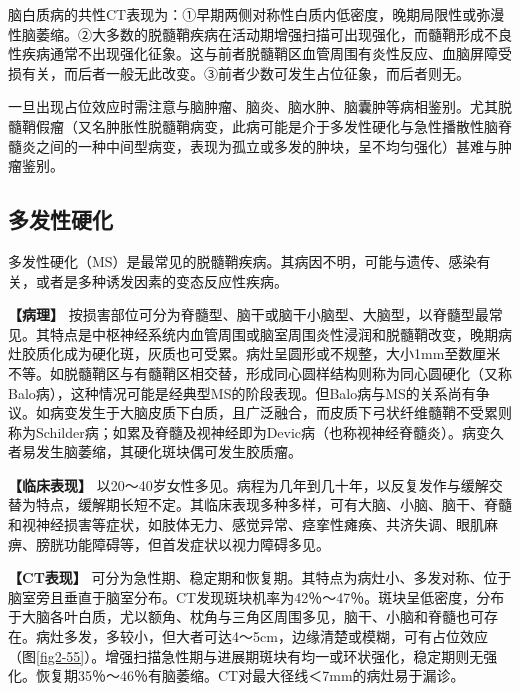 脑白质病的共性CT表现为：①早期两侧对称性白质内低密度，晚期局限性或弥漫性脑萎缩。②大多数的脱髓鞘疾病在活动期增强扫描可出现强化，而髓鞘形成不良性疾病通常不出现强化征象。这与前者脱髓鞘区血管周围有炎性反应、血脑屏障受损有关，而后者一般无此改变。③前者少数可发生占位征象，而后者则无。

一旦出现占位效应时需注意与脑肿瘤、脑炎、脑水肿、脑囊肿等病相鉴别。尤其脱髓鞘假瘤（又名肿胀性脱髓鞘病变，此病可能是介于多发性硬化与急性播散性脑脊髓炎之间的一种中间型病变，表现为孤立或多发的肿块，呈不均匀强化）甚难与肿瘤鉴别。

\subsection{多发性硬化}

多发性硬化（MS）是最常见的脱髓鞘疾病。其病因不明，可能与遗传、感染有关，或者是多种诱发因素的变态反应性疾病。

\textbf{【病理】}
按损害部位可分为脊髓型、脑干或脑干小脑型、大脑型，以脊髓型最常见。其特点是中枢神经系统内血管周围或脑室周围炎性浸润和脱髓鞘改变，晚期病灶胶质化成为硬化斑，灰质也可受累。病灶呈圆形或不规整，大小1mm至数厘米不等。如脱髓鞘区与有髓鞘区相交替，形成同心圆样结构则称为同心圆硬化（又称Balo病），这种情况可能是经典型MS的阶段表现。但Balo病与MS的关系尚有争议。如病变发生于大脑皮质下白质，且广泛融合，而皮质下弓状纤维髓鞘不受累则称为Schilder病；如累及脊髓及视神经即为Devic病（也称视神经脊髓炎）。病变久者易发生脑萎缩，其硬化斑块偶可发生胶质瘤。

\textbf{【临床表现】}
以20～40岁女性多见。病程为几年到几十年，以反复发作与缓解交替为特点，缓解期长短不定。其临床表现多种多样，可有大脑、小脑、脑干、脊髓和视神经损害等症状，如肢体无力、感觉异常、痉挛性瘫痪、共济失调、眼肌麻痹、膀胱功能障碍等，但首发症状以视力障碍多见。

\textbf{【CT表现】}
可分为急性期、稳定期和恢复期。其特点为病灶小、多发对称、位于脑室旁且垂直于脑室分布。CT发现斑块机率为42％～47％。斑块呈低密度，分布于大脑各叶白质，尤以额角、枕角与三角区周围多见，脑干、小脑和脊髓也可存在。病灶多发，多较小，但大者可达4～5cm，边缘清楚或模糊，可有占位效应（图\ref{fig2-55}）。增强扫描急性期与进展期斑块有均一或环状强化，稳定期则无强化。恢复期35％～46％有脑萎缩。CT对最大径线＜7mm的病灶易于漏诊。

